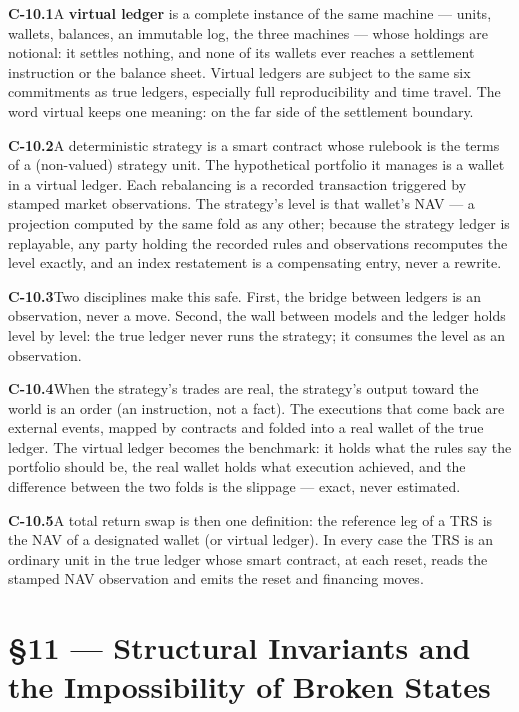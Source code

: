 \documentclass[11pt,a4paper]{article}
\newcommand{\clause}[2]{\par\medskip\noindent\textbf{#1}\hspace{0.6em}#2}
\begin{document}
\clause{C-10.1}{A \textbf{virtual ledger} is a complete instance of the same
machine --- units, wallets, balances, an immutable log, the three machines ---
whose holdings are notional: it settles nothing, and none of its wallets ever
reaches a settlement instruction or the balance sheet. Virtual ledgers are subject
to the same six commitments as true ledgers, especially full reproducibility and
time travel. The word virtual keeps one meaning: on the far side of the settlement
boundary.}

\clause{C-10.2}{A deterministic strategy is a smart contract whose rulebook is the
terms of a (non-valued) strategy unit. The hypothetical portfolio it manages is a
wallet in a virtual ledger. Each rebalancing is a recorded transaction triggered
by stamped market observations. The strategy's level is that wallet's NAV --- a
projection computed by the same fold as any other; because the strategy ledger is
replayable, any party holding the recorded rules and observations recomputes the
level exactly, and an index restatement is a compensating entry, never a rewrite.}

\clause{C-10.3}{Two disciplines make this safe. First, the bridge between ledgers
is an observation, never a move. Second, the wall between models and the ledger
holds level by level: the true ledger never runs the strategy; it consumes the
level as an observation.}

\clause{C-10.4}{When the strategy's trades are real, the strategy's output toward
the world is an order (an instruction, not a fact). The executions that come back
are external events, mapped by contracts and folded into a real wallet of the true
ledger. The virtual ledger becomes the benchmark: it holds what the rules say the
portfolio should be, the real wallet holds what execution achieved, and the
difference between the two folds is the slippage --- exact, never estimated.}

\clause{C-10.5}{A total return swap is then one definition: the reference leg of a
TRS is the NAV of a designated wallet (or virtual ledger). In every case the TRS
is an ordinary unit in the true ledger whose smart contract, at each reset, reads
the stamped NAV observation and emits the reset and financing moves.}

\section*{\S11 --- Structural Invariants and the Impossibility of Broken States}
\end{document}
